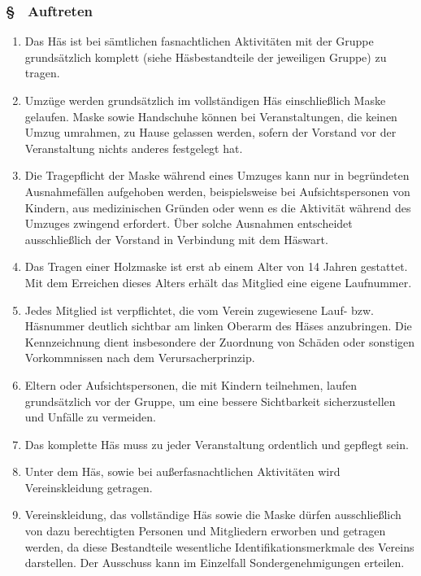 \subsubsection{§ \thehoparagraphcounter\ Auftreten} \label{ho:par:auftreten}
\begin{enumerate}
    \item \label{ho:abs:kaur4u} Das Häs ist bei sämtlichen fasnachtlichen Aktivitäten mit der Gruppe grundsätzlich komplett (siehe Häsbestandteile der jeweiligen Gruppe) zu tragen.

    \item \label{ho:abs:m7asdp} Umzüge werden grundsätzlich im vollständigen Häs einschließlich Maske gelaufen. Maske sowie Handschuhe können bei Veranstaltungen, die keinen Umzug umrahmen, zu Hause gelassen werden, sofern der Vorstand vor der Veranstaltung nichts anderes festgelegt hat.

    \item \label{ho:abs:0q7e6d} Die Tragepflicht der Maske während eines Umzuges kann nur in begründeten Ausnahmefällen aufgehoben werden, beispielsweise bei Aufsichtspersonen von Kindern, aus medizinischen Gründen oder wenn es die Aktivität während des Umzuges zwingend erfordert. Über solche Ausnahmen entscheidet ausschließlich der Vorstand in Verbindung mit dem Häswart.

    \item \label{ho:abs:gm8v5f} Das Tragen einer Holzmaske ist erst ab einem Alter von 14 Jahren gestattet. Mit dem Erreichen dieses Alters erhält das Mitglied eine eigene Laufnummer.

    \item \label{ho:abs:ncbau0} Jedes Mitglied ist verpflichtet, die vom Verein zugewiesene Lauf- bzw. Häsnummer deutlich sichtbar am linken Oberarm des Häses anzubringen. Die Kennzeichnung dient insbesondere der Zuordnung von Schäden oder sonstigen Vorkommnissen nach dem Verursacherprinzip.

    \item \label{ho:abs:znwjym} Eltern oder Aufsichtspersonen, die mit Kindern teilnehmen, laufen grundsätzlich vor der Gruppe, um eine bessere Sichtbarkeit sicherzustellen und Unfälle zu vermeiden.

    \item \label{ho:abs:r36xte} Das komplette Häs muss zu jeder Veranstaltung ordentlich und gepflegt sein.

    \item \label{ho:abs:fn7a3k} Unter dem Häs, sowie bei außerfasnachtlichen Aktivitäten wird Vereinskleidung getragen.

    \item \label{ho:abs:f4ioqu} Vereinskleidung, das vollständige Häs sowie die Maske dürfen ausschließlich von dazu berechtigten Personen und Mitgliedern erworben und getragen werden, da diese Bestandteile wesentliche Identifikationsmerkmale des Vereins darstellen. Der Ausschuss kann im Einzelfall Sondergenehmigungen erteilen.
\end{enumerate}

